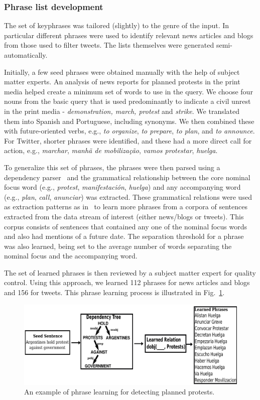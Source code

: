 \subsubsection{Phrase list development}
\label{sec:phraselearning}
The set of keyphrases was tailored (slightly) to the genre of the
input. In particular different phrases were used to identify relevant
news articles and blogs from those used to filter tweets.  The lists
themselves were generated semi-automatically.

Initially, a few seed phrases were obtained manually with the help of
subject matter experts.  An analysis of news reports for planned
protests in the print media helped create a minimum set of words to use
in the query.  We choose four nouns from the basic query that is used
predominantly to indicate a civil unrest in the print media - {\em
demonstration, march, protest} and {\it strike}. We translated them into
Spanish and Portuguese, including synonyms.  We then combined these with
future-oriented verbs, e.g., {\em to organize}, {\em to prepare}, {\em
to plan}, and {\em to announce}. For Twitter, shorter phrases were
identified, and these had a more direct call for action, e.g., {\em
marchar}, {\em manhã de mobilização}, {\em vamos protestar}, {\em
huelga}.

To generalize this set of phrases, the phrases were then parsed
using a dependency parser~\cite{freeling} and the grammatical
relationship between the core nominal focus word (e.g., {\em protest}, 
{\em manifestación}, {\em huelga}) and any accompanying
word (e.g., {\em plan}, {\em call}, {\em anunciar}) was
extracted. These grammatical relations were used as extraction
patterns as in~\cite{riloff2003learning} to learn more phrases from a
corpora of sentences extracted from the data stream of interest
(either news/blogs or tweets). This corpus consists of sentences that
contained any one of the nominal focus words and also had mentions of
a future date. The separation threshold for a phrase was also
learned, being set to the average number of words separating
the nominal focus and the accompanying word.

The set of learned phrases is then reviewed by a subject matter expert for quality control.  
Using this approach, we learned 112 phrases for news articles and blogs and 156 for tweets.  
This phrase learning process is illustrated in Fig.~\ref{fig:phraselearning}.

\begin{figure}
\includegraphics[scale=0.2]{figures/phraseLearning}
\caption{An example of phrase learning for detecting planned protests.}
\label{fig:phraselearning}
\end{figure}

